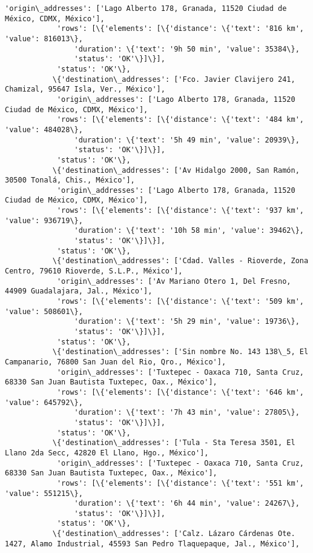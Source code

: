 \documentclass[11pt]{article}
\begin{document}
\begin{Verbatim}[commandchars=\\\{\}]
            'origin\_addresses': ['Lago Alberto 178, Granada, 11520 Ciudad de México, CDMX, México'],
            'rows': [\{'elements': [\{'distance': \{'text': '816 km', 'value': 816013\},
                'duration': \{'text': '9h 50 min', 'value': 35384\},
                'status': 'OK'\}]\}],
            'status': 'OK'\},
           \{'destination\_addresses': ['Fco. Javier Clavijero 241, Chamizal, 95647 Isla, Ver., México'],
            'origin\_addresses': ['Lago Alberto 178, Granada, 11520 Ciudad de México, CDMX, México'],
            'rows': [\{'elements': [\{'distance': \{'text': '484 km', 'value': 484028\},
                'duration': \{'text': '5h 49 min', 'value': 20939\},
                'status': 'OK'\}]\}],
            'status': 'OK'\},
           \{'destination\_addresses': ['Av Hidalgo 2000, San Ramón, 30500 Tonalá, Chis., México'],
            'origin\_addresses': ['Lago Alberto 178, Granada, 11520 Ciudad de México, CDMX, México'],
            'rows': [\{'elements': [\{'distance': \{'text': '937 km', 'value': 936719\},
                'duration': \{'text': '10h 58 min', 'value': 39462\},
                'status': 'OK'\}]\}],
            'status': 'OK'\},
           \{'destination\_addresses': ['Cdad. Valles - Rioverde, Zona Centro, 79610 Rioverde, S.L.P., México'],
            'origin\_addresses': ['Av Mariano Otero 1, Del Fresno, 44909 Guadalajara, Jal., México'],
            'rows': [\{'elements': [\{'distance': \{'text': '509 km', 'value': 508601\},
                'duration': \{'text': '5h 29 min', 'value': 19736\},
                'status': 'OK'\}]\}],
            'status': 'OK'\},
           \{'destination\_addresses': ['Sin nombre No. 143 138\_5, El Campanario, 76800 San Juan del Rio, Qro., México'],
            'origin\_addresses': ['Tuxtepec - Oaxaca 710, Santa Cruz, 68330 San Juan Bautista Tuxtepec, Oax., México'],
            'rows': [\{'elements': [\{'distance': \{'text': '646 km', 'value': 645792\},
                'duration': \{'text': '7h 43 min', 'value': 27805\},
                'status': 'OK'\}]\}],
            'status': 'OK'\},
           \{'destination\_addresses': ['Tula - Sta Teresa 3501, El Llano 2da Secc, 42820 El Llano, Hgo., México'],
            'origin\_addresses': ['Tuxtepec - Oaxaca 710, Santa Cruz, 68330 San Juan Bautista Tuxtepec, Oax., México'],
            'rows': [\{'elements': [\{'distance': \{'text': '551 km', 'value': 551215\},
                'duration': \{'text': '6h 44 min', 'value': 24267\},
                'status': 'OK'\}]\}],
            'status': 'OK'\},
           \{'destination\_addresses': ['Calz. Lázaro Cárdenas Ote. 1427, Alamo Industrial, 45593 San Pedro Tlaquepaque, Jal., México'],

\end{Verbatim}
\end{document}
